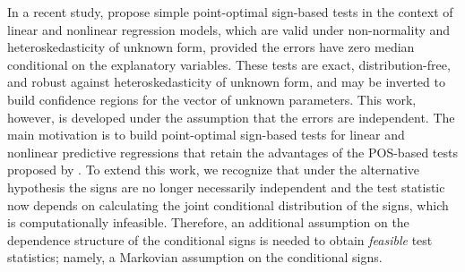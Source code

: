 \documentclass[harvard,11pt]{article}
\begin{document}


In a recent study, \citet{dufour2010exact} propose simple
point-optimal sign-based tests in the context of linear and nonlinear regression models,
which are valid under non-normality and hetero\-skedasticity of unknown form,
provided the errors have zero median conditional on the explanatory
variables. These tests are exact, distribution-free, and robust against
hetero\-skedasticity of unknown form, and may be inverted to build confidence
regions for the vector of unknown parameters. This work, however, is
developed under the assumption that the errors are independent. The
main motivation is to build point-optimal sign-based tests for linear and
nonlinear predictive regressions that retain the advantages of the POS-based tests proposed by \citet{dufour2010exact}. To extend this work, we recognize that under the alternative hypothesis the signs are no longer necessarily independent and the test statistic now depends on calculating the joint conditional distribution of the signs, which is computationally infeasible. Therefore, an additional assumption on the dependence structure of the conditional signs is needed to obtain \textit{feasible} test
statistics; namely, a Markovian assumption on the conditional signs. 
\end{document}
